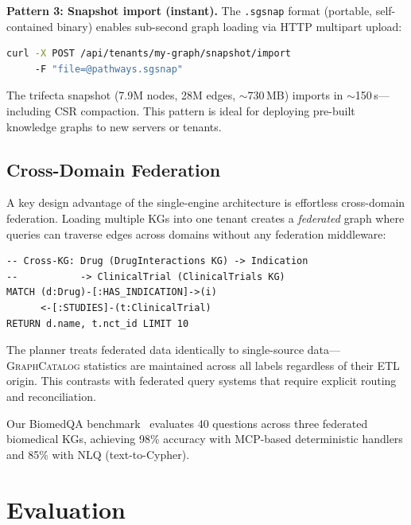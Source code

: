 \documentclass[sigconf, nonacm]{acmart}
\begin{document}
\textbf{Pattern 3: Snapshot import (instant).}
The \texttt{.sgsnap} format (portable, self-contained binary) enables sub-second graph loading via HTTP multipart upload:

\begin{lstlisting}[language=bash,keywordstyle=\color{black}]
curl -X POST /api/tenants/my-graph/snapshot/import
     -F "file=@pathways.sgsnap"
\end{lstlisting}

\noindent
The trifecta snapshot (7.9M nodes, 28M edges, ${\sim}$730\,MB) imports in ${\sim}$150\,s---including CSR compaction.
This pattern is ideal for deploying pre-built knowledge graphs to new servers or tenants.

\subsection{Cross-Domain Federation}

A key design advantage of the single-engine architecture is effortless cross-domain federation.
Loading multiple KGs into one tenant creates a \emph{federated} graph where queries can traverse edges across domains without any federation middleware:

\begin{lstlisting}
-- Cross-KG: Drug (DrugInteractions KG) -> Indication
--           -> ClinicalTrial (ClinicalTrials KG)
MATCH (d:Drug)-[:HAS_INDICATION]->(i)
      <-[:STUDIES]-(t:ClinicalTrial)
RETURN d.name, t.nct_id LIMIT 10
\end{lstlisting}

\noindent
The planner treats federated data identically to single-source data---\textsc{GraphCatalog} statistics are maintained across all labels regardless of their ETL origin.
This contrasts with federated query systems that require explicit routing and reconciliation.

Our BiomedQA benchmark~\cite{mandarapu2025biomedkg} evaluates 40 questions across three federated biomedical KGs, achieving 98\% accuracy with MCP-based deterministic handlers and 85\% with NLQ (text-to-Cypher).

\section{Evaluation}
\label{sec:eval}
\end{document}
